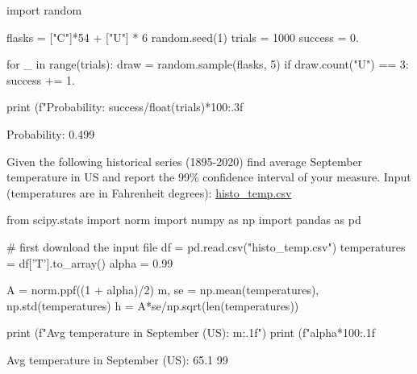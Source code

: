 \cprotEnv\begin{solution}
\begin{ipython}
import random

flasks = ["C"]*54 + ["U"] * 6
random.seed(1)
trials = 1000
success = 0.

for _ in range(trials):
    draw = random.sample(flasks, 5)
    if draw.count("U") == 3:
        success += 1.

print (f"Probability: {success/float(trials)*100:.3f}%
\end{ipython}
\begin{ioutput}
Probability: 0.499%
\end{ioutput}
\end{solution}

\begin{question}
Given the following historical series (1895-2020) find average September temperature in US and report the 99\% confidence interval of your measure.
\noindent
Input (temperatures are in Fahrenheit degrees): \href{https://raw.githubusercontent.com/matteosan1/finance_course/master/input_files/histo_temp.csv}{histo\_temp.csv}
\end{question}

\cprotEnv\begin{solution}
\begin{ipython}
from scipy.stats import norm
import numpy as np
import pandas as pd

# first download the input file
df = pd.read.csv("histo_temp.csv")
temperatures = df['T'].to_array()
alpha = 0.99

A = norm.ppf((1 + alpha)/2)
m, se = np.mean(temperatures), np.std(temperatures)
h = A*se/np.sqrt(len(temperatures))

print (f"Avg temperature in September (US): {m:.1f}")
print (f"{alpha*100:.1f}%
\end{ipython}
\begin{ioutput}
Avg temperature in September (US): 65.1
99%
\end{ioutput}
\end{solution}

